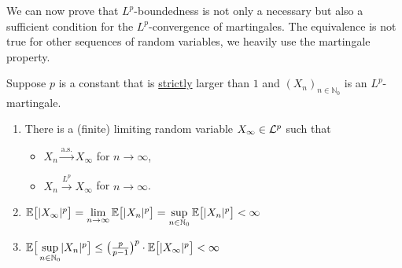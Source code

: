 We can now prove that $L^p$-boundedness is not only a necessary but also a sufficient condition for the $L^p$-convergence of martingales. The equivalence is not true for other sequences of random variables, we heavily use the martingale property.
\begin{lsuperwichtigersatz}
\begin{theorem}
Suppose $p$ is a constant that is \underline{strictly} larger than $1$ and $(X_n)_{n\in\mathbb{N}_0}$ is an $L^p$-martingale. 
	\begin{enumerate}[label=(\roman*)]
		\item There is a (finite) limiting random variable $X_{\infty}\in \mathcal{L}^p$ such that
		\begin{itemize}
			\item $X_n \overset{\text{a.s.}}{\to} X_{\infty}$ for $n \to \infty$,
			\item $X_n \overset{L^p}{\to}X_{\infty}$ for $n \to \infty$.
		\end{itemize}
			\item $\mathbb{E}\big[\lvert X_{\infty}\rvert^p\big] = \lim\limits_{n\to \infty}\mathbb{E}\big[\lvert X_n \rvert^p\big] = \sup\limits_{n\in\mathbb{N}_0} \mathbb{E}\big[\lvert X_n \rvert^p\big] < \infty$
			\item $\mathbb{E}\big[\sup\limits_{n\in\mathbb{N}_0}\lvert X_n \rvert^p\big] \leq \big(\frac{p}{p-1}\big)^p \cdot \mathbb{E}\big[\lvert X_{\infty}\rvert^p\big] < \infty$
	\end{enumerate}	
\end{theorem}
\end{lsuperwichtigersatz}
